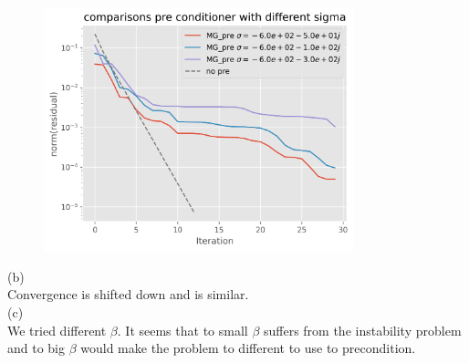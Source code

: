 \documentclass[a4paper,12pt]{article}
\begin{document}
\begin{figure}[h!]
    \centering
    \includegraphics[width=0.8\textwidth]{../code/plts/convergence_gmres_wave_basis20.png}
    \caption{}
    \label{fig:convergence gmreas wavebasis 20}
\end{figure}


(b) \\
Convergence is shifted down and is similar.\\
(c) \\
We tried different $\beta$. It seems that to small $\beta$ suffers from the instability problem and
to big $\beta$ would make the problem to different to use to precondition.
\end{document}
